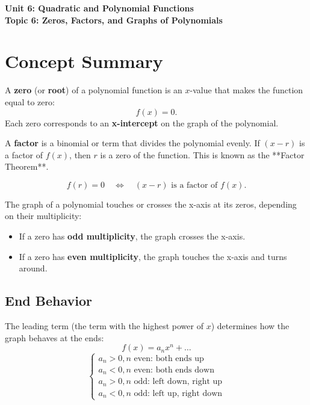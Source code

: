 \documentclass[12pt]{article}
\begin{document}
\begin{center}
    \LARGE \textbf{Unit 6: Quadratic and Polynomial Functions} \\[6pt]
    \Large \textbf{Topic 6: Zeros, Factors, and Graphs of Polynomials}
\end{center}

\vspace{1em}

\section*{Concept Summary}

A \textbf{zero} (or \textbf{root}) of a polynomial function is an \(x\)-value that makes the function equal to zero:
\[
f(x) = 0.
\]
Each zero corresponds to an \textbf{x-intercept} on the graph of the polynomial.

A \textbf{factor} is a binomial or term that divides the polynomial evenly.  
If \((x - r)\) is a factor of \(f(x)\), then \(r\) is a zero of the function.  
This is known as the **Factor Theorem**.

\[
f(r) = 0 \quad \Leftrightarrow \quad (x - r) \text{ is a factor of } f(x).
\]

The graph of a polynomial touches or crosses the x-axis at its zeros, depending on their multiplicity:
\begin{itemize}
  \item If a zero has \textbf{odd multiplicity}, the graph crosses the x-axis.
  \item If a zero has \textbf{even multiplicity}, the graph touches the x-axis and turns around.
\end{itemize}

\subsection*{End Behavior}
The leading term (the term with the highest power of \(x\)) determines how the graph behaves at the ends:
\[
f(x) = a_nx^n + \dots
\]
\[
\begin{cases}
a_n > 0, n \text{ even: both ends up} \\
a_n < 0, n \text{ even: both ends down} \\
a_n > 0, n \text{ odd: left down, right up} \\
a_n < 0, n \text{ odd: left up, right down}
\end{cases}
\]
\end{document}
